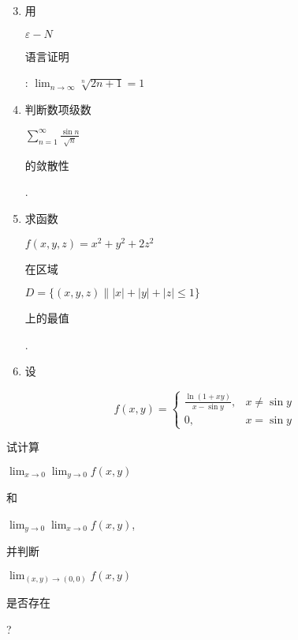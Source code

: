 \documentclass[10pt]{article}
\begin{document}
\begin{enumerate}
  \setcounter{enumi}{2}
  \item \begin{CJK}{UTF8}{mj}用\end{CJK} $\varepsilon-N$ \begin{CJK}{UTF8}{mj}语言证明\end{CJK}: $\lim _{n \rightarrow \infty} \sqrt[n]{2 n+1}=1$

  \item \begin{CJK}{UTF8}{mj}判断数项级数\end{CJK} $\sum_{n=1}^{\infty} \frac{\sin n}{\sqrt{n}}$ \begin{CJK}{UTF8}{mj}的敛散性\end{CJK}.

  \item \begin{CJK}{UTF8}{mj}求函数\end{CJK} $f(x, y, z)=x^{2}+y^{2}+2 z^{2}$ \begin{CJK}{UTF8}{mj}在区域\end{CJK} $D=\{(x, y, z) \||x|+|y|+|z| \leq 1\}$ \begin{CJK}{UTF8}{mj}上的最值\end{CJK}.

  \item \begin{CJK}{UTF8}{mj}设\end{CJK}

\end{enumerate}
$$
f(x, y)= \begin{cases}\frac{\ln (1+x y)}{x-\sin y}, & x \neq \sin y \\ 0, & x=\sin y\end{cases}
$$
\begin{CJK}{UTF8}{mj}试计算\end{CJK} $\lim _{x \rightarrow 0} \lim _{y \rightarrow 0} f(x, y)$ \begin{CJK}{UTF8}{mj}和\end{CJK} $\lim _{y \rightarrow 0} \lim _{x \rightarrow 0} f(x, y)$, \begin{CJK}{UTF8}{mj}并判断\end{CJK} $\lim _{(x, y) \rightarrow(0,0)} f(x, y)$ \begin{CJK}{UTF8}{mj}是否存在\end{CJK}?
\end{document}
